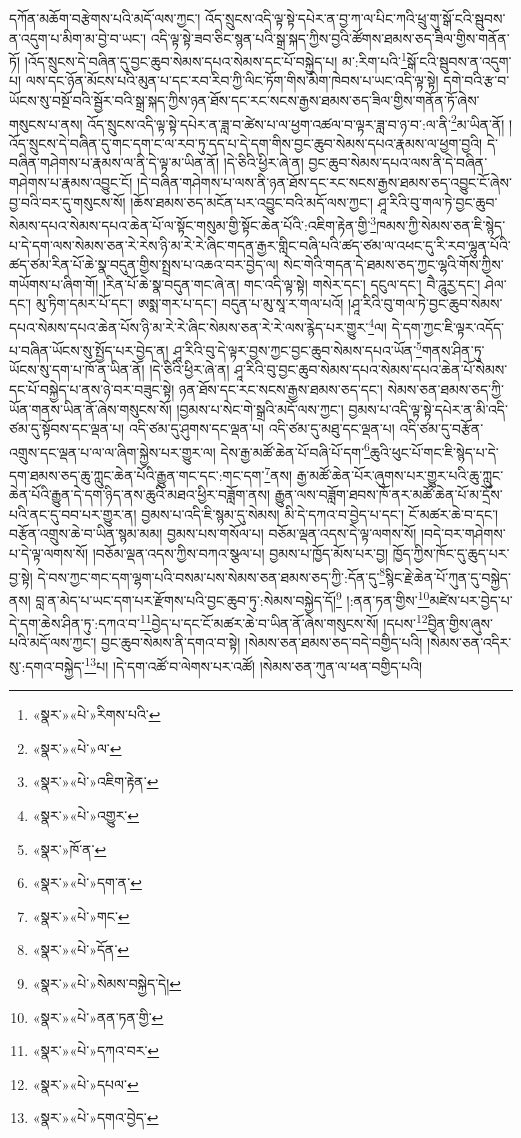 དཀོན་མཆོག་བརྩེགས་པའི་མདོ་ལས་ཀྱང་། འོད་སྲུངས་འདི་ལྟ་སྟེ་དཔེར་ན་བྱ་ཀ་ལ་པིང་ཀའི་ཕྲུ་གུ་སྒོ་ངའི་སྦུབས་ན་འདུག་པ་མིག་མ་བྱེ་བ་ཡང་། འདི་ལྟ་སྟེ་ཟབ་ཅིང་སྙན་པའི་སྒྲ་སྐད་ཀྱིས་བྱའི་ཚོགས་ཐམས་ཅད་ཟིལ་གྱིས་གནོན་ཏོ། །འོད་སྲུངས་དེ་བཞིན་དུ་བྱང་ཆུབ་སེམས་དཔའ་སེམས་དང་པོ་བསྐྱེད་པ། མ་:རིག་པའི་\footnote{«སྣར་»«པེ་»རིགས་པའི་}སྒོ་ངའི་སྦུབས་ན་འདུག་པ། ལས་དང་ཉོན་མོངས་པའི་མུན་པ་དང་རབ་རིབ་ཀྱི་ལིང་ཏོག་གིས་མིག་ཁེབས་པ་ཡང་འདི་ལྟ་སྟེ། དགེ་བའི་རྩ་བ་ཡོངས་སུ་བསྔོ་བའི་སྦྱོར་བའི་སྒྲ་སྐད་ཀྱིས་ཉན་ཐོས་དང་རང་སངས་རྒྱས་ཐམས་ཅད་ཟིལ་གྱིས་གནོན་ཏོ་ཞེས་གསུངས་པ་ནས། འོད་སྲུངས་འདི་ལྟ་སྟེ་དཔེར་ན་ཟླ་བ་ཚེས་པ་ལ་ཕྱག་འཚལ་བ་ལྟར་ཟླ་བ་ཉ་བ་:ལ་ནི་\footnote{«སྣར་»«པེ་»ལ་}མ་ཡིན་ནོ། །འོད་སྲུངས་དེ་བཞིན་དུ་གང་དག་ང་ལ་རབ་ཏུ་དད་པ་དེ་དག་གིས་བྱང་ཆུབ་སེམས་དཔའ་རྣམས་ལ་ཕྱག་བྱའི། དེ་བཞིན་གཤེགས་པ་རྣམས་ལ་ནི་དེ་ལྟ་མ་ཡིན་ནོ། །དེ་ཅིའི་ཕྱིར་ཞེ་ན། བྱང་ཆུབ་སེམས་དཔའ་ལས་ནི་དེ་བཞིན་གཤེགས་པ་རྣམས་འབྱུང་ངོ། །དེ་བཞིན་གཤེགས་པ་ལས་ནི་ཉན་ཐོས་དང་རང་སངས་རྒྱས་ཐམས་ཅད་འབྱུང་ངོ་ཞེས་བྱ་བའི་བར་དུ་གསུངས་སོ། །ཆོས་ཐམས་ཅད་མངོན་པར་འབྱུང་བའི་མདོ་ལས་ཀྱང་། ཤཱ་རིའི་བུ་གལ་ཏེ་བྱང་ཆུབ་སེམས་དཔའ་སེམས་དཔའ་ཆེན་པོ་ལ་སྟོང་གསུམ་གྱི་སྟོང་ཆེན་པོའི་:འཇིག་རྟེན་གྱི་\footnote{«སྣར་»«པེ་»འཇིག་རྟེན་}ཁམས་ཀྱི་སེམས་ཅན་ཇི་སྙེད་པ་དེ་དག་ལས་སེམས་ཅན་རེ་རེས་ཉི་མ་རེ་རེ་ཞིང་གདན་རྒྱར་གླིང་བཞི་པའི་ཚད་ཙམ་ལ་འཕང་དུ་རི་རབ་ལྷུན་པོའི་ཚད་ཙམ་རིན་པོ་ཆེ་སྣ་བདུན་གྱིས་སྤྲས་པ་འཆའ་བར་བྱེད་ལ། སེང་གེའི་གདན་དེ་ཐམས་ཅད་ཀྱང་ལྷའི་གོས་ཀྱིས་གཡོགས་པ་ཞིག་གོ། །རིན་པོ་ཆེ་སྣ་བདུན་གང་ཞེ་ན། གང་འདི་ལྟ་སྟེ། གསེར་དང་། དངུལ་དང་། བཻ་ཌཱུརྱ་དང་། ཤེལ་དང་། མུ་ཏིག་དམར་པོ་དང་། ཨསྨ་གར་པ་དང་། བདུན་པ་མུ་སཱ་ར་གལ་པའོ། །ཤཱ་རིའི་བུ་གལ་ཏེ་བྱང་ཆུབ་སེམས་དཔའ་སེམས་དཔའ་ཆེན་པོས་ཉི་མ་རེ་རེ་ཞིང་སེམས་ཅན་རེ་རེ་ལས་རྙེད་པར་གྱུར་\footnote{«སྣར་»«པེ་»འགྱུར་}ལ། དེ་དག་ཀྱང་ཇི་ལྟར་འདོད་པ་བཞིན་ཡོངས་སུ་སྤྱོད་པར་བྱེད་ན། ཤཱ་རིའི་བུ་དེ་ལྟར་བྱས་ཀྱང་བྱང་ཆུབ་སེམས་དཔའ་ཡོན་\footnote{«སྣར་»ཁོ་ན་}གནས་ཤིན་ཏུ་ཡོངས་སུ་དག་པ་ཁོ་ན་ཡིན་ནོ། །དེ་ཅིའི་ཕྱིར་ཞེ་ན། ཤཱ་རིའི་བུ་བྱང་ཆུབ་སེམས་དཔའ་སེམས་དཔའ་ཆེན་པོ་སེམས་དང་པོ་བསྐྱེད་པ་ནས་ཉེ་བར་བཟུང་སྟེ། ཉན་ཐོས་དང་རང་སངས་རྒྱས་ཐམས་ཅད་དང་། སེམས་ཅན་ཐམས་ཅད་ཀྱི་ཡོན་གནས་ཡིན་ནོ་ཞེས་གསུངས་སོ། །བྱམས་པ་སེང་གེ་སྒྲའི་མདོ་ལས་ཀྱང་། བྱམས་པ་འདི་ལྟ་སྟེ་དཔེར་ན་མི་འདི་ཙམ་དུ་སྟོབས་དང་ལྡན་པ། འདི་ཙམ་དུ་ཤུགས་དང་ལྡན་པ། འདི་ཙམ་དུ་མཐུ་དང་ལྡན་པ། འདི་ཙམ་དུ་བརྩོན་འགྲུས་དང་ལྡན་པ་ལ་ལ་ཞིག་སྐྱེས་པར་གྱུར་ལ། དེས་རྒྱ་མཚོ་ཆེན་པོ་བཞི་པོ་དག་\footnote{«སྣར་»«པེ་»དག་ན་}ཆུའི་ཕུང་པོ་གང་ཇི་སྙེད་པ་དེ་དག་ཐམས་ཅད་ཆུ་ཀླུང་ཆེན་པོའི་རྒྱུན་གང་དང་:གང་དག་\footnote{«སྣར་»«པེ་»གང་}ནས། རྒྱ་མཚོ་ཆེན་པོར་ཞུགས་པར་གྱུར་པའི་ཆུ་ཀླུང་ཆེན་པོའི་རྒྱུན་དེ་དག་ཉིད་ནས་ཆུའི་མཐའ་ཕྱིར་བཟློག་ནས། རྒྱུན་ལས་བཟློག་ཐབས་ཁོ་ནར་མཚོ་ཆེན་པོ་མ་དྲོས་པའི་ནང་དུ་བབ་པར་གྱུར་ན། བྱམས་པ་འདི་ཇི་སྙམ་དུ་སེམས། མི་དེ་དཀའ་བ་བྱེད་པ་དང་། ངོ་མཚར་ཆེ་བ་དང་། བརྩོན་འགྲུས་ཆེ་བ་ཡིན་སྙམ་མམ། བྱམས་པས་གསོལ་པ། བཅོམ་ལྡན་འདས་དེ་ལྟ་ལགས་སོ། །བདེ་བར་གཤེགས་པ་དེ་ལྟ་ལགས་སོ། །བཅོམ་ལྡན་འདས་ཀྱིས་བཀའ་སྩལ་པ། བྱམས་པ་ཁྱོད་མོས་པར་བྱ། ཁྱོད་ཀྱིས་ཁོང་དུ་ཆུད་པར་བྱ་སྟེ། དེ་བས་ཀྱང་གང་དག་ལྷག་པའི་བསམ་པས་སེམས་ཅན་ཐམས་ཅད་ཀྱི་:དོན་དུ་\footnote{«སྣར་»«པེ་»དོན་}སྙིང་རྗེ་ཆེན་པོ་ཀུན་དུ་བསྐྱེད་ནས། བླ་ན་མེད་པ་ཡང་དག་པར་རྫོགས་པའི་བྱང་ཆུབ་ཏུ་:སེམས་བསྐྱེད་དོ།\footnote{«སྣར་»«པེ་»སེམས་བསྐྱེད་དེ།} །:ནན་ཏན་གྱིས་\footnote{«སྣར་»«པེ་»ནན་ཏན་གྱི་}མཛེས་པར་བྱེད་པ་དེ་དག་ཆེས་ཤིན་ཏུ་:དཀའ་བ་\footnote{«སྣར་»«པེ་»དཀའ་བར་}བྱེད་པ་དང་ངོ་མཚར་ཆེ་བ་ཡིན་ནོ་ཞེས་གསུངས་སོ། །དཔས་\footnote{«སྣར་»«པེ་»དཔལ་}བྱིན་གྱིས་ཞུས་པའི་མདོ་ལས་ཀྱང་། བྱང་ཆུབ་སེམས་ནི་དགའ་བ་སྟེ། །སེམས་ཅན་ཐམས་ཅད་བདེ་བགྱིད་པའི། །སེམས་ཅན་འདིར་སུ་:དགའ་བསྐྱེད་\footnote{«སྣར་»«པེ་»དགའ་བྱེད་}པ། །དེ་དག་འཚོ་བ་ལེགས་པར་འཚོ། །སེམས་ཅན་ཀུན་ལ་ཕན་བགྱིད་པའི། 
